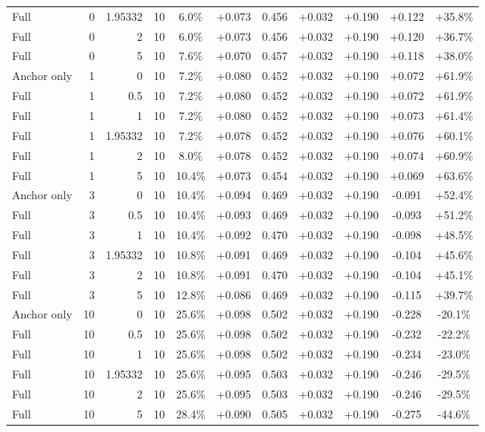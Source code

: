 \begin{table}[htbp]
\begin{tabular}{lrrrccccccc}
Full & 0 & 1.95332 & 10 & 6.0\% & +0.073 & 0.456 & +0.032 & +0.190 & +0.122 & +35.8\% \\
Full & 0 & 2 & 10 & 6.0\% & +0.073 & 0.456 & +0.032 & +0.190 & +0.120 & +36.7\% \\
Full & 0 & 5 & 10 & 7.6\% & +0.070 & 0.457 & +0.032 & +0.190 & +0.118 & +38.0\% \\
Anchor only & 1 & 0 & 10 & 7.2\% & +0.080 & 0.452 & +0.032 & +0.190 & +0.072 & +61.9\% \\
Full & 1 & 0.5 & 10 & 7.2\% & +0.080 & 0.452 & +0.032 & +0.190 & +0.072 & +61.9\% \\
Full & 1 & 1 & 10 & 7.2\% & +0.080 & 0.452 & +0.032 & +0.190 & +0.073 & +61.4\% \\
Full & 1 & 1.95332 & 10 & 7.2\% & +0.078 & 0.452 & +0.032 & +0.190 & +0.076 & +60.1\% \\
Full & 1 & 2 & 10 & 8.0\% & +0.078 & 0.452 & +0.032 & +0.190 & +0.074 & +60.9\% \\
Full & 1 & 5 & 10 & 10.4\% & +0.073 & 0.454 & +0.032 & +0.190 & +0.069 & +63.6\% \\
Anchor only & 3 & 0 & 10 & 10.4\% & +0.094 & 0.469 & +0.032 & +0.190 & -0.091 & +52.4\% \\
Full & 3 & 0.5 & 10 & 10.4\% & +0.093 & 0.469 & +0.032 & +0.190 & -0.093 & +51.2\% \\
Full & 3 & 1 & 10 & 10.4\% & +0.092 & 0.470 & +0.032 & +0.190 & -0.098 & +48.5\% \\
Full & 3 & 1.95332 & 10 & 10.8\% & +0.091 & 0.469 & +0.032 & +0.190 & -0.104 & +45.6\% \\
Full & 3 & 2 & 10 & 10.8\% & +0.091 & 0.470 & +0.032 & +0.190 & -0.104 & +45.1\% \\
Full & 3 & 5 & 10 & 12.8\% & +0.086 & 0.469 & +0.032 & +0.190 & -0.115 & +39.7\% \\
Anchor only & 10 & 0 & 10 & 25.6\% & +0.098 & 0.502 & +0.032 & +0.190 & -0.228 & -20.1\% \\
Full & 10 & 0.5 & 10 & 25.6\% & +0.098 & 0.502 & +0.032 & +0.190 & -0.232 & -22.2\% \\
Full & 10 & 1 & 10 & 25.6\% & +0.098 & 0.502 & +0.032 & +0.190 & -0.234 & -23.0\% \\
Full & 10 & 1.95332 & 10 & 25.6\% & +0.095 & 0.503 & +0.032 & +0.190 & -0.246 & -29.5\% \\
Full & 10 & 2 & 10 & 25.6\% & +0.095 & 0.503 & +0.032 & +0.190 & -0.246 & -29.5\% \\
Full & 10 & 5 & 10 & 28.4\% & +0.090 & 0.505 & +0.032 & +0.190 & -0.275 & -44.6\% \\

\end{tabular}
\end{table}
